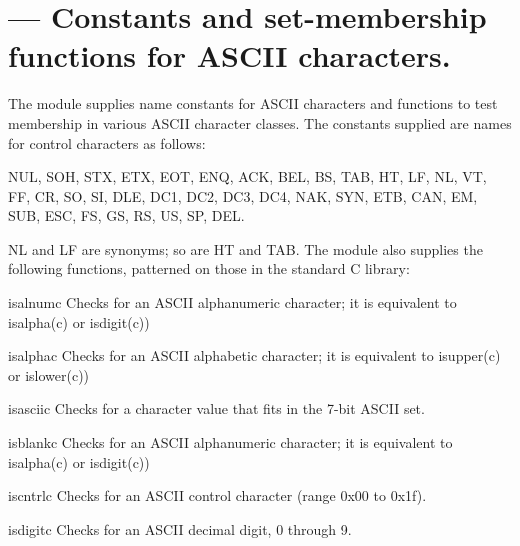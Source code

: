 \section{ ---
         Constants and set-membership functions for ASCII characters.}



The  module supplies name constants for ASCII characters
and functions to test membership in various ASCII character classes.  
The constants supplied are names for control characters as follows:

NUL, SOH, STX, ETX, EOT, ENQ, ACK, BEL, BS, TAB, HT, LF, NL, VT, FF, CR,
SO, SI, DLE, DC1, DC2, DC3, DC4, NAK, SYN, ETB, CAN, EM, SUB, ESC, FS, 
GS, RS, US, SP, DEL.

NL and LF are synonyms; so are HT and TAB.  The module also supplies
the following functions, patterned on those in the standard C library:

\begin{funcdesc}{isalnum}{c}
Checks for an ASCII alphanumeric character; it is equivalent to
isalpha(c) or isdigit(c))
\end{funcdesc}

\begin{funcdesc}{isalpha}{c}
Checks for an ASCII alphabetic character; it is equivalent to
isupper(c) or islower(c))
\end{funcdesc}

\begin{funcdesc}{isascii}{c}
Checks for a character value that fits in the 7-bit ASCII set.
\end{funcdesc}

\begin{funcdesc}{isblank}{c}
Checks for an ASCII alphanumeric character; it is equivalent to
isalpha(c) or isdigit(c))
\end{funcdesc}

\begin{funcdesc}{iscntrl}{c}
Checks for an ASCII control character (range 0x00 to 0x1f).
\end{funcdesc}

\begin{funcdesc}{isdigit}{c}
Checks for an ASCII decimal digit, 0 through 9.
\end{funcdesc}

